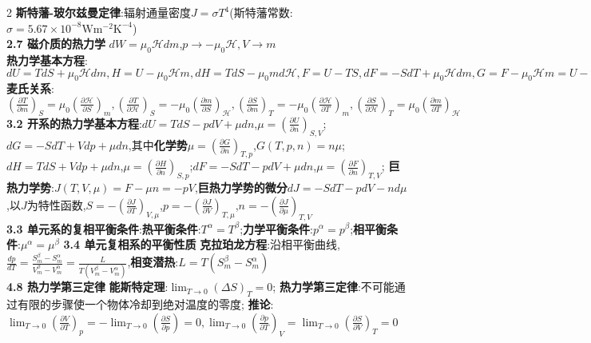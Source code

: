 \documentclass[10pt,a4paper]{article}
\begin{document}
\begin{multicols}{2}
\textbf{斯特藩-玻尔兹曼定律}:辐射通量密度$J=\sigma T^4$(斯特藩常数:$\sigma=5.67\times10^{-8}\text{W}\text{m}^{-2}\text{K}^{-4}$)\\
\textbf{2.7 磁介质的热力学}
$dW=\mu_0\mathcal{H}dm$,$p\rightarrow-\mu_0\mathcal{H},V\rightarrow m$\\
\textbf{热力学基本方程}:$dU=TdS+\mu_0\mathcal{H}dm,H=U-\mu_0\mathcal{H}m,dH=TdS-\mu_0md\mathcal{H},F=U-TS,dF=-SdT+\mu_0\mathcal{H}dm,G=F-\mu_0\mathcal{H}m=U-TS-\mu_0\mathcal{H}m,dG=-SdT-\mu_0md\mathcal{H}$\quad\quad
\textbf{麦氏关系}:$\left(\frac{\partial T}{\partial m}\right)_S=\mu_0\left(\frac{\partial\mathcal{H}}{\partial S}\right)_m,\left(\frac{\partial T}{\partial\mathcal{H}}\right)_S=-\mu_0\left(\frac{\partial m}{\partial S}\right)_{\mathcal{H}},\left(\frac{\partial S}{\partial m}\right)_T=-\mu_0\left(\frac{\partial\mathcal{H}}{\partial T}\right)_m,\left(\frac{\partial S}{\partial\mathcal{H}}\right)_T=\mu_0\left(\frac{\partial m}{\partial T}\right)_{\mathcal{H}}$\\
\noindent\textbf{3.2 开系的热力学基本方程}:$dU=TdS-pdV+\mu dn$,$\mu=\left(\frac{\partial U}{\partial n}\right)_{S,V}$;$dG=-SdT+Vdp+\mu dn$,其中\textbf{化学势}$\mu=\left(\frac{\partial G}{\partial n}\right)_{T,p}$,$G(T,p,n)=n\mu$;$dH=TdS+Vdp+\mu dn$,$\mu=\left(\frac{\partial H}{\partial n}\right)_{S,p}$;$dF=-SdT-pdV+\mu dn$,$\mu=\left(\frac{\partial F}{\partial n}\right)_{T,V}$;\quad\quad\quad\quad
\textbf{巨热力学势}:$J(T,V,\mu)=F-\mu n=-pV$,\textbf{巨热力学势的微分}$dJ=-SdT-pdV-nd\mu$,以$J$为特性函数,$S=-\left(\frac{\partial J}{\partial T}\right)_{V,\mu}$,$p=-\left(\frac{\partial J}{\partial V}\right)_{T,\mu}$,$n=-\left(\frac{\partial J}{\partial\mu}\right)_{T,V}$\\
\textbf{3.3 单元系的复相平衡条件}:\textbf{热平衡条件}:$T^{\alpha}=T^{\beta}$;\textbf{力学平衡条件}:$p^{\alpha}=p^{\beta}$;\textbf{相平衡条件}:$\mu^{\alpha}=\mu^{\beta}$\quad\quad
\textbf{3.4 单元复相系的平衡性质}
\textbf{克拉珀龙方程}:沿相平衡曲线,$\frac{dp}{dT}=\frac{S_m^{\beta}-S_m^{\alpha}}{V_m^{\beta}-V_m^{\alpha}}=\frac{L}{T(V_m^{\beta}-V_m^{\alpha})}$,\textbf{相变潜热}:$L=T(S_m^{\beta}-S_m^{\alpha})$\\
\noindent\textbf{4.8 热力学第三定律}
\textbf{能斯特定理}:$\lim_{T\rightarrow0}(\Delta S)_T=0$;
\textbf{热力学第三定律}:不可能通过有限的步骤使一个物体冷却到绝对温度的零度;
\textbf{推论}:$\lim_{T\rightarrow0}\left(\frac{\partial V}{\partial T}\right)_p=-\lim_{T\rightarrow0}\left(\frac{\partial S}{\partial p}\right)=0,\lim_{T\rightarrow0}\left(\frac{\partial p}{\partial T}\right)_V=\lim_{T\rightarrow0}\left(\frac{\partial S}{\partial V}\right)_T=0$
\end{multicols}
\end{document}
